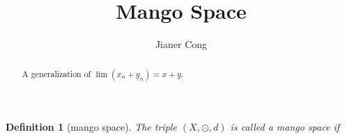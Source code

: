 \documentclass[12pt,a4paper]{article}
\author{Jianer Cong}
\title{Mango Space}
\newtheorem{def}{Definition}
\begin{document}
\maketitle
\begin{abstract}
A generalization of $\lim (x_n + y_n) = x + y$.
\end{abstract}
\begin{def}[mango space]
  The triple $(X,\odot ,d)$ is called a \emph{mango space} if
  
\end{def}
\end{document}
